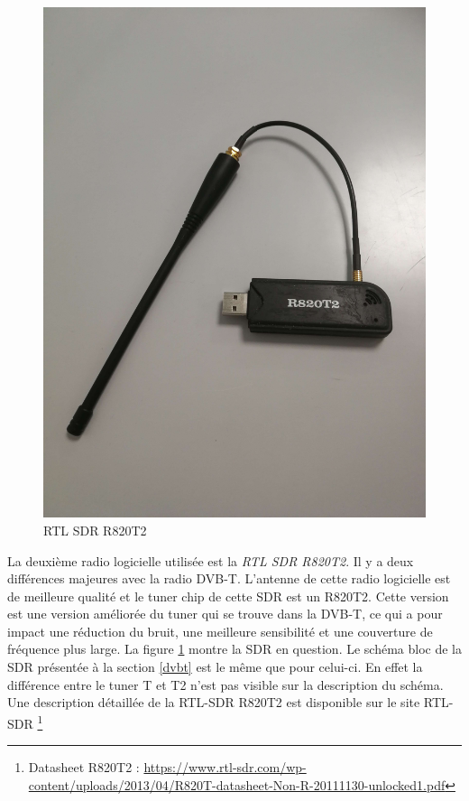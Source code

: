 \begin{figure}[h]
\centering

\includegraphics[scale=0.08]{images/r820t2.png}
\caption{RTL SDR R820T2}\label{term32}
\end{figure}

La deuxième radio logicielle utilisée est la \textit{RTL SDR R820T2}. Il y a deux différences majeures avec la radio \ac{DVB-T}. L'antenne de cette radio logicielle est de meilleure qualité et le tuner chip de cette \ac{SDR} est un R820T2. Cette version est une version améliorée du tuner qui se trouve dans la \ac{DVB-T}, ce qui a pour impact une réduction du bruit, une meilleure sensibilité et une couverture de fréquence plus large. La figure \ref{term32} montre la \ac{SDR} en question. Le schéma bloc de la \ac{SDR} présentée à la section \ref{dvbt} est le même que pour celui-ci. En effet la différence entre le tuner T et T2 n'est pas visible sur la description du schéma. Une description détaillée de la RTL-SDR R820T2 est disponible sur le site RTL-SDR \footnote{Datasheet R820T2 : \href{https://www.rtl-sdr.com/wp-content/uploads/2013/04/R820T_datasheet-Non_R-20111130_unlocked1.pdf}{https://www.rtl-sdr.com/wp-content/uploads/2013/04/R820T-datasheet-Non-R-20111130-unlocked1.pdf}}


